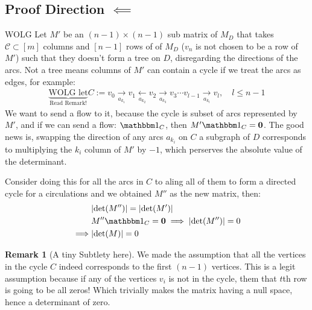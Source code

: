 \documentclass[]{article}
\theoremstyle{definition}
\newtheorem{remark}{Remark}[subsection]
\begin{document}
    \subsection{Proof Direction $\impliedby$}
        WOLG Let $M'$ be an $(n- 1)\times (n - 1)$ sub matrix of $M_D$ that takes $\mathcal C\subset [m]$ columns and $[n-1]$ rows of of $M_D$ ($v_n$ is not chosen to be a row of $M'$) such that they doesn't form a tree on $D$, disregarding the directions of the arcs. Not a tree means columns of $M'$ can contain a cycle if we treat the arcs as edges, for example: 
        \begin{align}
            \underbrace{\text{WOLG let}}_{\text{Read Remark!} }  C := v_0 \underset{a_{k_1}}{\longrightarrow} v_1 \underset{a_{k_2}}{\longleftarrow} v_2 \underset{a_{k_3}}{\longrightarrow} v_3 \cdots v_{l - 1} \underset{a_{k_l}}{\longrightarrow} v_l, \quad l \le n - 1 
        \end{align}
        We want to send a flow to it, because the cycle is subset of arcs represented by $M'$, and if we can send a flow: $\mathbbm 1_C$, then $M'\mathbbm 1_C = \mathbf 0$. The good news is, swapping the direction of any arcs $a_{k_i}$ on $C$ a subgraph of $D$ corresponds to multiplying the $k_i$ column of $M'$ by $-1$, which perserves the absolute value of the determinant. 
        \par
        Consider doing this for all the arcs in $C$ to aling all of them to form a directed cycle for a circulations and we obtained $M''$ as the new matrix, then: 
        \begin{align}
            & |\text{det}(M'')| = |\text{det}(M')|
            \\
            & M'' \mathbbm 1_C = \mathbf 0 \implies |\text{det}(M'')| = 0
            \\
            \implies & |\text{det}(M)| = 0
        \end{align}
        \begin{remark}[A tiny Subtlety here]
           We made the assumption that all the vertices in the cycle $C$ indeed corresponds to the first $(n - 1)$ vertices. This is a legit assumption because if any of the vertices $v_i$ is not in the cycle, them that $t$th row is going to be all zeros! Which trivially makes the matrix having a null space, hence a determinant of zero. 
        \end{remark}
\end{document}

